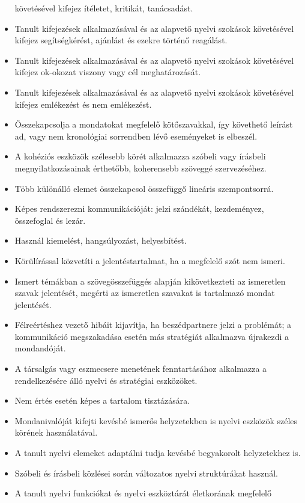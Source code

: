 \begin{itemize}
  követésével kifejez ítéletet, kritikát, tanácsadást.
\item
  Tanult kifejezések alkalmazásával és az alapvető nyelvi szokások
  követésével kifejez segítségkérést, ajánlást és ezekre történő
  reagálást.
\item
  Tanult kifejezések alkalmazásával és az alapvető nyelvi szokások
  követésével kifejez ok-okozat viszony vagy cél meghatározását.
\item
  Tanult kifejezések alkalmazásával és az alapvető nyelvi szokások
  követésével kifejez emlékezést és nem emlékezést.
\item
  Összekapcsolja a mondatokat megfelelő kötőszavakkal, így követhető
  leírást ad, vagy nem kronológiai sorrendben lévő eseményeket is
  elbeszél.
\item
  A kohéziós eszközök szélesebb körét alkalmazza szóbeli vagy írásbeli
  megnyilatkozásainak érthetőbb, koherensebb szöveggé szervezéséhez.
\item
  Több különálló elemet összekapcsol összefüggő lineáris szempontsorrá.
\item
  Képes rendszerezni kommunikációját: jelzi szándékát, kezdeményez,
  összefoglal és lezár.
\item
  Használ kiemelést, hangsúlyozást, helyesbítést.
\item
  Körülírással közvetíti a jelentéstartalmat, ha a megfelelő szót nem
  ismeri.
\item
  Ismert témákban a szövegösszefüggés alapján kikövetkezteti az
  ismeretlen szavak jelentését, megérti az ismeretlen szavakat is
  tartalmazó mondat jelentését.
\item
  Félreértéshez vezető hibáit kijavítja, ha beszédpartnere jelzi a
  problémát; a kommunikáció megszakadása esetén más stratégiát
  alkalmazva újrakezdi a mondandóját.
\item
  A társalgás vagy eszmecsere menetének fenntartásához alkalmazza a
  rendelkezésére álló nyelvi és stratégiai eszközöket.
\item
  Nem értés esetén képes a tartalom tisztázására.
\item
  Mondanivalóját kifejti kevésbé ismerős helyzetekben is nyelvi eszközök
  széles körének használatával.
\item
  A tanult nyelvi elemeket adaptálni tudja kevésbé begyakorolt
  helyzetekhez is.
\item
  Szóbeli és írásbeli közlései során változatos nyelvi struktúrákat
  használ.
\item
  A tanult nyelvi funkciókat és nyelvi eszköztárát életkorának megfelelő

\end{itemize}
